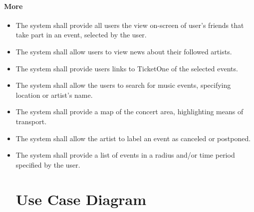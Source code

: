 \documentclass[11pt,a4paper]{article}
\begin{document}
\paragraph{More}
\begin{itemize}
\item The system shall provide all users the view on-screen of user’s friends that take part in an event, selected by the user.
\item The system shall allow users to view news about their followed artists.
\item The system shall provide users links to TicketOne of the selected events.
\item The system shall allow the users to search for music events, specifying location or artist’s name.
\item The system shall provide a map of the concert area, highlighting means of transport.
\item The system shall allow the artist to label an event as canceled or postponed.
\item The system shall provide a list of events in a radius and/or time period specified by the user.
\section{Use Case Diagram}


\end{itemize}
\end{document}
